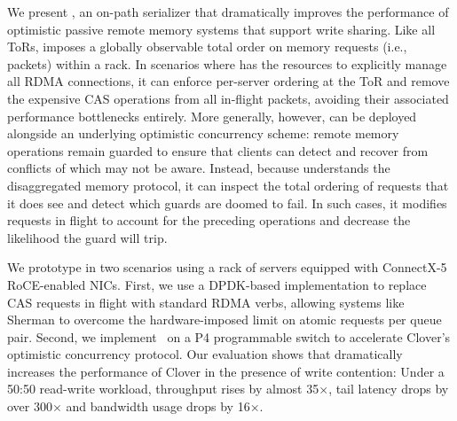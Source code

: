 We present {\sword}, an on-path serializer
that dramatically improves the performance of optimistic passive
remote memory systems that support write sharing.  Like all ToRs,
{\sword} imposes a globally observable total order on memory requests
(i.e., packets) within a rack.  In scenarios where {\sword} has the
resources to explicitly manage all RDMA connections, it can enforce
per-server ordering at the ToR and remove the expensive CAS operations
from all in-flight packets, avoiding their associated performance
bottlenecks entirely.  More generally, however, {\sword} can be
deployed alongside an underlying optimistic concurrency scheme: remote
memory operations remain guarded to ensure that clients can detect and
recover from conflicts of which {\sword} may not be aware.  Instead,
because {\sword} understands the disaggregated memory protocol, it can
inspect the total ordering of requests that it does see and detect
which guards are doomed to fail.  In such cases,
it modifies requests in
flight to account for the preceding operations and decrease the
likelihood the guard will trip.

We prototype {\sword} in two scenarios using a rack of servers
equipped with ConnectX-5 RoCE-enabled NICs.  First, we use a
DPDK-based implementation to replace CAS requests in flight with
standard RDMA verbs, allowing systems like Sherman to overcome the
hardware-imposed limit on atomic requests per queue pair.  Second, we
implement \sword\ on a P4 programmable switch to accelerate Clover's
optimistic concurrency protocol. Our evaluation shows that {\sword}
dramatically increases the performance of Clover in the presence of
write contention: Under a 50:50 read-write workload, throughput rises
by almost 35$\times$, tail latency drops by over 300$\times$ and
bandwidth usage drops by 16$\times$.

